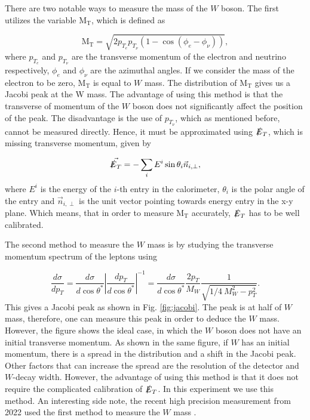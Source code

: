 \documentclass[a4paper]{report}
\numberwithin{equation}{section}
\begin{document}
There are two notable ways to measure the mass of the $W$ boson. The first utilizes the variable $\text{M}_\text{T}$, which is defined as

\begin{equation}
\mathrm{M_T} = \sqrt{2 p_{T_e} p_{T_{\nu}} (1 - \cos(\phi_e - \phi_{\nu}))},
\end{equation}
where $p_{T_e}$ and $p_{T_{\nu}}$ are the transverse momentum of the electron and neutrino respectively, $\phi_e$ and $\phi_{\nu}$ are the azimuthal angles. If we consider the mass of the electron to be zero, $\mathrm{M_T}$ is equal to $W$ mass. The distribution of $\mathrm{M_T}$ gives us a Jacobi peak at the W mass. The advantage of using this method is that the transverse of momentum of the $W$ boson does not significantly affect the position of the peak. The disadvantage is the use of $p_{T_{\nu}}$, which as mentioned before, cannot be measured directly. Hence, it must be approximated using $\slashed{E}_T$, which is missing transverse momentum, given by

\begin{equation}
	\vec{\slashed{E}_T}	= - \sum_{i} E^i \sin \theta_i \vec{n}_{i, \perp},
\end{equation}
where $E^i$ is the energy of the $i$-th entry in the calorimeter, $\theta_i$ is the polar angle of the entry and $\vec{n}_{i, \perp}$ is the unit vector pointing towards energy entry in the x-y plane. Which means, that in order to measure $\mathrm{M_T}$ accurately, $\slashed{E}_T$ has to be well calibrated. 

The second method to measure the $W$ mass is by studying the transverse momentum spectrum of the leptons using

\begin{equation}
	\frac{d \sigma}{d p_T} = \frac{d \sigma}{d \cos \theta ^*} \left| \frac{d p_T}{d \cos \theta ^*} \right| ^{-1} = \frac{d \sigma}{d \cos \theta ^*} \frac{2p_T}{M_W} \frac{1}{\sqrt{1/4 \ M_W^2 - p_T^2}}.
\end{equation}
This gives a Jacobi peak as shown in Fig. \ref{fig:jacobi}. The peak is at half of $W$ mass, therefore, one can measure this peak in order to deduce the $W$ mass. However, the figure shows the ideal case, in which the $W$ boson does not have an initial transverse momentum. As shown in the same figure, if $W$ has an initial momentum, there is a spread in the distribution and a shift in the Jacobi peak. Other factors that can increase the spread are the resolution of the detector and $W$-decay width. However, the advantage of using this method is that it does not require the complicated calibration of $\slashed{E}_T$. In this experiment we use this method. An interesting side note, the recent high precision measurement from 2022 used the first method to measure the $W$ mass \cite{CDF:2022hxs}.
\end{document}
